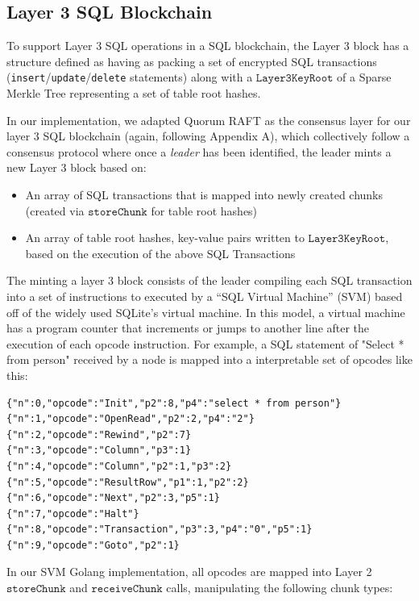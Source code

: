 \documentclass{article}
\begin{document}
\subsection{Layer 3 SQL Blockchain}

To support Layer 3 SQL operations in a SQL blockchain, the Layer 3 block has a  structure defined as having as packing a set of encrypted SQL transactions ({\tt insert}/{\tt update}/{\tt delete} statements)  along with a $\texttt{Layer3KeyRoot}$ of a Sparse Merkle Tree representing a set of table root hashes.

In our implementation, we adapted Quorum RAFT as the consensus layer for our layer 3 SQL blockchain (again, following Appendix A), which collectively follow a consensus protocol where once a {\em leader} has been identified, the leader mints a new Layer 3 block based on: 
\begin{itemize}
\item An array of SQL transactions that is mapped into newly created chunks (created via $\texttt{storeChunk}$ for table root hashes)
\item An array of table root hashes, key-value pairs written to $\texttt{Layer3KeyRoot}$, based on the execution of the above SQL Transactions 
\end{itemize}  
The minting a layer 3 block consists of the leader compiling each SQL transaction into a set of instructions to executed by a ``SQL Virtual Machine'' (SVM) based off of the widely used SQLite's virtual machine.  In this model, a virtual machine has a program counter that increments or jumps to another line after the execution of each opcode instruction.  For example, a SQL statement of "Select * from person" received by a node is mapped into a interpretable set of opcodes like this:
\begin{verbatim}
{"n":0,"opcode":"Init","p2":8,"p4":"select * from person"}
{"n":1,"opcode":"OpenRead","p2":2,"p4":"2"}
{"n":2,"opcode":"Rewind","p2":7}
{"n":3,"opcode":"Column","p3":1}
{"n":4,"opcode":"Column","p2":1,"p3":2}
{"n":5,"opcode":"ResultRow","p1":1,"p2":2}
{"n":6,"opcode":"Next","p2":3,"p5":1}
{"n":7,"opcode":"Halt"}
{"n":8,"opcode":"Transaction","p3":3,"p4":"0","p5":1}
{"n":9,"opcode":"Goto","p2":1}
\end{verbatim} 
In our SVM Golang implementation, all opcodes are mapped into Layer 2 $\texttt{storeChunk}$ and  $\texttt{receiveChunk}$ calls, manipulating the following chunk types:
\end{document}
